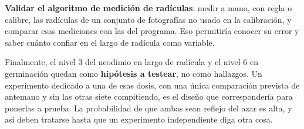 \textbf{Validar el algoritmo de medición de radículas}: medir a mano, con regla o calibre, las radículas de un conjunto de fotografías no usado en la calibración, y comparar esas mediciones con las del programa. Eso permitiría conocer su error y saber cuánto confiar en el largo de radícula como variable.

Finalmente, el nivel 3 del neodimio en largo de radícula y el nivel 6 en germinación quedan como \textbf{hipótesis a testear}, no como hallazgos. Un experimento dedicado a una de esas dosis, con una única comparación prevista de antemano y sin las otras siete compitiendo, es el diseño que correspondería para ponerlas a prueba. La probabilidad de que ambas sean reflejo del azar es alta, y así deben tratarse hasta que un experimento independiente diga otra cosa.
